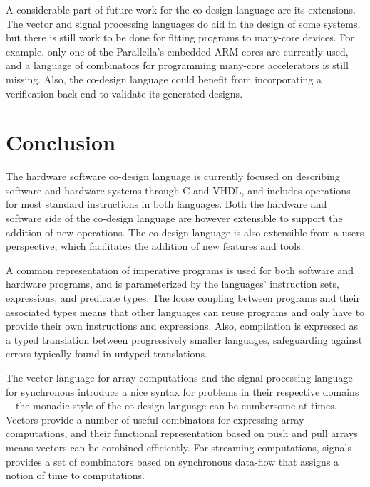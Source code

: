 \documentclass[../paper.tex]{subfiles}
\begin{document}
A considerable part of future work for the co-design language are its extensions. The vector and signal processing languages do aid in the design of some systems, but there is still work to be done for fitting programs to many-core devices. For example, only one of the Parallella's embedded ARM cores are currently used, and a language of combinators for programming many-core accelerators is still missing. Also, the co-design language could benefit from incorporating a verification back-end to validate its generated designs.

\section{Conclusion}
\label{conc}

The hardware software co-design language is currently focused on describing software and hardware systems through C and VHDL, and includes operations for most standard instructions in both languages. Both the hardware and software side of the co-design language are however extensible to support the addition of new operations. The co-design language is also extensible from a users perspective, which facilitates the addition of new features and tools.

A common representation of imperative programs is used for both software and hardware programs, and is parameterized by the languages' instruction sets, expressions, and predicate types. The loose coupling between programs and their associated types means that other languages can reuse programs and only have to provide their own instructions and expressions. Also, compilation is expressed as a typed translation between progressively smaller languages, safeguarding against errors typically found in untyped translations.

The vector language for array computations and the signal processing language for synchronous introduce a nice syntax for problems in their respective domains---the monadic style of the co-design language can be cumbersome at times. Vectors provide a number of useful combinators for expressing array computations, and their functional representation based on push and pull arrays means vectors can be combined efficiently. For streaming computations, signals provides a set of combinators based on synchronous data-flow that assigns a notion of time to computations.
\end{document}
